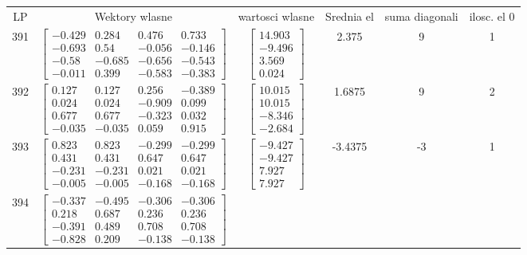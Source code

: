 \documentclass[a4paper,12pt]{article}
\begin{document}
\bgroup {} \vspace{0.2in} \begin{tabular}{c c c c c c}
LP &Wektory wlasne & wartosci wlasne & Srednia el & suma diagonali & ilosc. el 0\\
391
&
$\begin{bmatrix} -0.429 & 0.284 & 0.476 & 0.733 \\ -0.693 & 0.54 & -0.056 & -0.146 \\ -0.58 & -0.685 & -0.656 & -0.543 \\ -0.011 & 0.399 & -0.583 & -0.383 \end{bmatrix}$
&
$\begin{bmatrix} 14.903 \\ -9.496 \\ 3.569 \\ 0.024 \end{bmatrix}$
&
2.375
&
9
&
1
\\
392
&
$\begin{bmatrix} 0.127 & 0.127 & 0.256 & -0.389 \\ 0.024 & 0.024 & -0.909 & 0.099 \\ 0.677 & 0.677 & -0.323 & 0.032 \\ -0.035 & -0.035 & 0.059 & 0.915 \end{bmatrix}$
&
$\begin{bmatrix} 10.015 \\ 10.015 \\ -8.346 \\ -2.684 \end{bmatrix}$
&
1.6875
&
9
&
2
\\
393
&
$\begin{bmatrix} 0.823 & 0.823 & -0.299 & -0.299 \\ 0.431 & 0.431 & 0.647 & 0.647 \\ -0.231 & -0.231 & 0.021 & 0.021 \\ -0.005 & -0.005 & -0.168 & -0.168 \end{bmatrix}$
&
$\begin{bmatrix} -9.427 \\ -9.427 \\ 7.927 \\ 7.927 \end{bmatrix}$
&
-3.4375
&
-3
&
1
\\
394
&
$\begin{bmatrix} -0.337 & -0.495 & -0.306 & -0.306 \\ 0.218 & 0.687 & 0.236 & 0.236 \\ -0.391 & 0.489 & 0.708 & 0.708 \\ -0.828 & 0.209 & -0.138 & -0.138 \end{bmatrix}$

\end{tabular}
\end{document}
